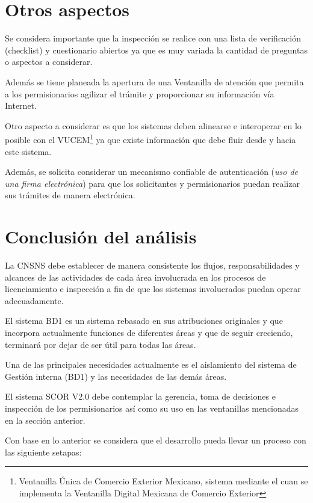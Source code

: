 \documentclass[10pt]{book}
\begin{document}
\section{Otros aspectos}

	Se considera importante que la inspección se realice con una lista de verificación (checklist) y cuestionario abiertos ya que es muy variada la cantidad de preguntas o aspectos a considerar.
	
	Además se tiene planeada la apertura de una Ventanilla de atención que permita a los permisionarios agilizar el trámite y proporcionar su información vía Internet.
	
	Otro aspecto a considerar es que los sistemas deben alinearse e interoperar en lo posible con el VUCEM\footnote{Ventanilla Única de Comercio Exterior Mexicano, sistema mediante el cuan se implementa la Ventanilla Digital Mexicana de Comercio Exterior} ya que existe información que debe fluir desde y hacia este sistema.
	
	Además, se solicita considerar un mecanismo confiable de autenticación ({\em uso de una firma electrónica}) para que los solicitantes y permisionarios puedan realizar sus trámites de manera electrónica.

\section{Conclusión del análisis}

	La CNSNS debe establecer de manera consistente los flujos, responsabilidades y alcances de las actividades de cada área involucrada en los procesos de licenciamiento e inspección a fin de que los sistemas involucrados puedan operar adecuadamente.
	
	El sistema BD1 es un sistema rebasado en sus atribuciones originales y que incorpora actualmente funciones de diferentes áreas y que de seguir creciendo, terminará por dejar de ser útil para todas las áreas.
	
	Una de las principales necesidades actualmente es el aislamiento del sistema de Gestión interna (BD1) y las necesidades de las demás áreas.
	
	El sistema SCOR V2.0 debe contemplar la gerencia, toma de decisiones e inspección de los permisionarios así como su uso en las ventanillas mencionadas en la sección anterior.
	
	Con base en lo anterior se considera que el desarrollo pueda llevar un proceso con las siguiente setapas:
	
\end{document}
